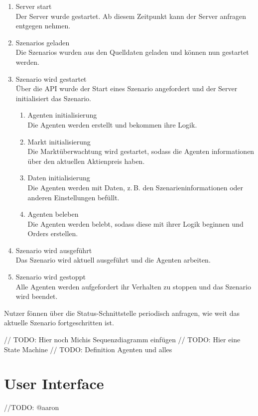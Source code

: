 \begin{enumerate}
    \item Server start\\
        Der Server wurde gestartet. Ab diesem Zeitpunkt kann der Server anfragen entgegen nehmen.
    \item Szenarios geladen\\
        Die Szenarios wurden aus den Quelldaten geladen und können nun gestartet werden.
    \item Szenario wird gestartet\\
        Über die \ac{API} wurde der Start eines Szenario angefordert und der Server initialisiert das Szenario.
        \begin{enumerate}
            \item Agenten initialisierung\\
                Die Agenten werden erstellt und bekommen ihre Logik.
            \item Markt initialisierung\\
                Die Marktüberwachtung wird gestartet, sodass die Agenten informationen über den aktuellen Aktienpreis haben.
            \item Daten initialisierung\\
                Die Agenten werden mit Daten, z.\,B. den Szenarieninformationen oder anderen Einstellungen befüllt.
            \item Agenten beleben\\
                Die Agenten werden belebt, sodass diese mit ihrer Logik beginnen und Orders erstellen.
        \end{enumerate}
    \item Szenario wird ausgeführt\\
        Das Szenario wird aktuell ausgeführt und die Agenten arbeiten.
    \item Szenario wird gestoppt\\
        Alle Agenten werden aufgefordert ihr Verhalten zu stoppen und das Szenario wird beendet.
\end{enumerate}



Nutzer fönnen über die Status-Schnittstelle periodisch anfragen, wie weit das aktuelle Szenario fortgeschritten ist.

// TODO: Hier noch Michis Sequenzdiagramm einfügen
// TODO: Hier eine State Machine
// TODO: Definition Agenten und alles 

\section{User Interface}
//TODO: @aaron
